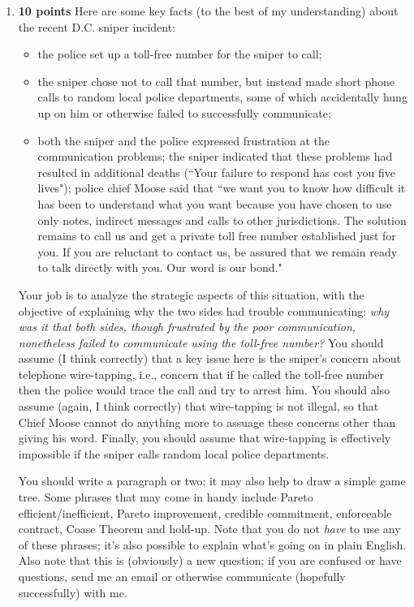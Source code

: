 \documentclass[twoside]{article}
\begin{document}
\begin{enumerate}
\begin{comment}
\end{comment}


\item \textbf{10 points} Here are some key facts (to the best of my understanding) about the recent D.C. sniper incident:
\begin{itemize}
\item the police set up a toll-free number for the sniper to call;
\item the sniper chose not to call that number, but instead made short phone calls to random local police departments, some of which accidentally hung up on him or otherwise failed to successfully communicate;
\item both the sniper and the police expressed frustration at the communication problems; the sniper indicated that these problems had resulted in additional deaths (``Your failure to respond has cost you five lives"); police chief Moose said that ``we want you to know how difficult it has been to understand what you want because you have chosen to use only notes, indirect messages and calls to other jurisdictions. The solution remains to call us and get a private toll free number established just for you. If you are reluctant to contact us, be assured that we remain ready to talk directly with you. Our word is our bond." 
\end{itemize}

Your job is to analyze the strategic aspects of this situation, with the objective of explaining why the two sides had trouble communicating: \emph{why was it that both sides, though frustrated by the poor communication, nonetheless failed to communicate using the toll-free number?} You should assume (I think correctly) that a key issue here is the sniper's concern about telephone wire-tapping, i.e., concern that if he called the toll-free number then the police would trace the call and try to arrest him. You should also assume (again, I think correctly) that wire-tapping is not illegal, so that Chief Moose cannot do anything more to assuage these concerns other than giving his word. Finally, you should assume that wire-tapping is effectively impossible if the sniper calls random local police departments. 

You should write a paragraph or two; it may also help to draw a simple game tree. Some phrases that may come in handy include Pareto efficient/inefficient, Pareto improvement, credible commitment, enforceable contract, Coase Theorem and hold-up. Note that you do not \emph{have} to use any of these phrases; it's also possible to explain what's going on in plain English. Also note that this is (obviously) a new question; if you are confused or have questions, send me an email or otherwise communicate (hopefully successfully) with me.



\end{enumerate}
\end{document}
